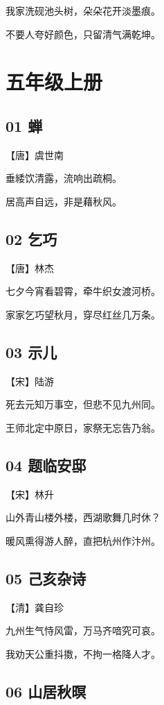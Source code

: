 \documentclass[a6paper, 12pt]{article}
\begin{document}
我家洗砚池头树，朵朵花开淡墨痕。

不要人夸好颜色，只留清气满乾坤。

\newpage

\section*{五年级上册}

\subsection*{01 蝉}

【唐】虞世南

垂緌饮清露，流响出疏桐。

居高声自远，非是藉秋风。

\subsection*{02 乞巧}


【唐】林杰

七夕今宵看碧霄，牵牛织女渡河桥。

家家乞巧望秋月，穿尽红丝几万条。

\subsection*{03 示儿}

【宋】陆游

死去元知万事空，但悲不见九州同。

王师北定中原日，家祭无忘告乃翁。

\subsection*{04 题临安邸}

【宋】林升

山外青山楼外楼，西湖歌舞几时休？

暖风熏得游人醉，直把杭州作汴州。

\subsection*{05 己亥杂诗}

【清】龚自珍

九州生气恃风雷，万马齐喑究可哀。

我劝天公重抖擞，不拘一格降人才。

\subsection*{06 山居秋暝}
\end{document}
